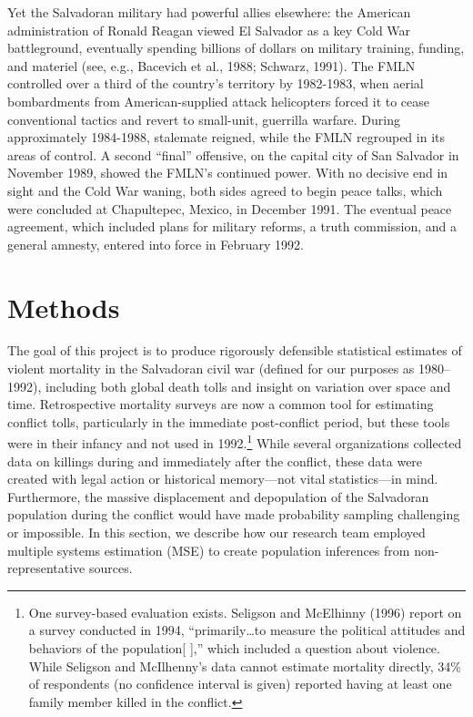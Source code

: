 \documentclass[11pt,]{article}
\let\rmarkdownfootnote\footnote%
\def\footnote{\protect\rmarkdownfootnote}
\begin{document}
Yet the Salvadoran military had powerful allies elsewhere: the American
administration of Ronald Reagan viewed El Salvador as a key Cold War
battleground, eventually spending billions of dollars on military
training, funding, and materiel (see, e.g., Bacevich et al., 1988;
Schwarz, 1991). The FMLN controlled over a third of the country's
territory by 1982-1983, when aerial bombardments from American-supplied
attack helicopters forced it to cease conventional tactics and revert to
small-unit, guerrilla warfare. During approximately 1984-1988, stalemate
reigned, while the FMLN regrouped in its areas of control. A second
``final'' offensive, on the capital city of San Salvador in November
1989, showed the FMLN's continued power. With no decisive end in sight
and the Cold War waning, both sides agreed to begin peace talks, which
were concluded at Chapultepec, Mexico, in December 1991. The eventual
peace agreement, which included plans for military reforms, a truth
commission, and a general amnesty, entered into force in February 1992.

\hypertarget{methods}{%
\section{Methods}\label{methods}}

The goal of this project is to produce rigorously defensible statistical
estimates of violent mortality in the Salvadoran civil war (defined for
our purposes as 1980--1992), including both global death tolls and
insight on variation over space and time. Retrospective mortality
surveys are now a common tool for estimating conflict tolls,
particularly in the immediate post-conflict period, but these tools were
in their infancy and not used in 1992.\footnote{One survey-based
  evaluation exists. Seligson and McElhinny (1996) report on a survey
  conducted in 1994, ``primarily\ldots{}to measure the political
  attitudes and behaviors of the population{[} {]},'' which included a
  question about violence. While Seligson and McIlhenny's data cannot
  estimate mortality directly, 34\% of respondents (no confidence
  interval is given) reported having at least one family member killed
  in the conflict.} While several organizations collected data on
killings during and immediately after the conflict, these data were
created with legal action or historical memory---not vital
statistics---in mind. Furthermore, the massive displacement and
depopulation of the Salvadoran population during the conflict would have
made probability sampling challenging or impossible. In this section, we
describe how our research team employed multiple systems estimation
(MSE) to create population inferences from non-representative sources.
\end{document}
